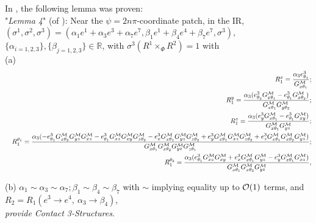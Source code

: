\documentclass[a4paper,11pt,fleqn]{article}
\theoremstyle{plain}
\theoremstyle{definition}
\begin{document}
In \cite{ACMS}, the following lemma was proven:\\
\noindent "{\it Lemma 4}" (of \cite{ACMS}): Near the $\psi=2n\pi$-coordinate patch, in the IR, \\ $(\sigma^1,\sigma^2,\sigma^3) = \left(\alpha_1 e^1 + \alpha_3 e^3 + \alpha_7 e^7, \beta_1 e^1 + \beta_4 e^4 + \beta_7 e^7,\sigma^3\right), $ $\{\alpha_{i=1, 2, 3}\}, \{\beta_{j=1, 2, 3}\}\in\mathbb{R}$, with $\sigma^3(R^1\times_\Phi R^2)=1$ with\\
(a)
\begin{eqnarray}
\label{contact-x0-5}
& & R^x_1=\frac{\alpha_3 e^3_{\theta_1}}{G^{\cal M}_{x\theta_1}};\nonumber\\
& & R^y_1=\frac{\alpha_3 (e^3_{\theta_2} G^{\cal M}_{x\theta_1}-e^3_{\theta_1} G^{\cal M}_{x\theta_2})}{G^{\cal M}_{x\theta_1}
   G^{\cal M}_{y\theta_2}};\nonumber\\
& & R^z_1=\frac{\alpha_3 (e^3_y G^{\cal M}_{x\theta_1}-e^3_{\theta_1} G^{\cal M}_{xy})}{G^{\cal M}_{x\theta_1} G^{\cal M}_{yz}};\nonumber\\
& & R^{\theta_1}_1=\frac{\alpha_3 (-e^3_{\theta_1} G^{\cal M}_{x\theta_2} G^{\cal M}_{yz} G^{\cal M}_{xz}-e^3_{\theta_1}
   G^{\cal M}_{xz} G^{\cal M}_{xy} G^{\cal M
}_{z\theta_2}-e^3_x G^{\cal M}_{x\theta_1} G^{\cal M}_{yz} G^{\cal M}_{z\theta_2}+e^3_y
   G^{\cal M}_{x\theta_1} G^{\cal M}_{xz} G^{\cal M}_{z\theta_2}+e^3_z G^{\cal M}_{x\theta_1} G^{\cal M}_{x\theta_2}
   G^{\cal M}_{yz})}{G^{\cal M}_{x\theta_1} G^{\cal M}_{x\theta_2} G^{\cal M}_{yz} G^{\cal M}_{z\theta_1}};\nonumber\\
& & R^{\theta_2}_1=\frac{\alpha_3 (e^3_{\theta_1} G^{\cal M}_{xz} G^{\cal M}_{xy}+e^3_x G^{\cal M}_{x\theta_1}
   G^{\cal M}_{yz}-e^3_y G^{\cal M}_{x\theta_1} G^{\cal M}_{xz})}{G^{\cal M}_{x\theta_1} G^{\cal M}_{x\theta_2} G^{\cal M}_{yz}},
\end{eqnarray}

(b) $\alpha_1\sim\alpha_3\sim\alpha_7; \beta_1\sim\beta_4\sim\beta_7$ with $\sim$ implying equality up to ${\cal O}(1)$ terms, and $R_2=R_1(e^3\rightarrow e^4,\ \alpha_3\rightarrow\beta_4)$, \\
{\it provide Contact 3-Structures}.
\end{document}
